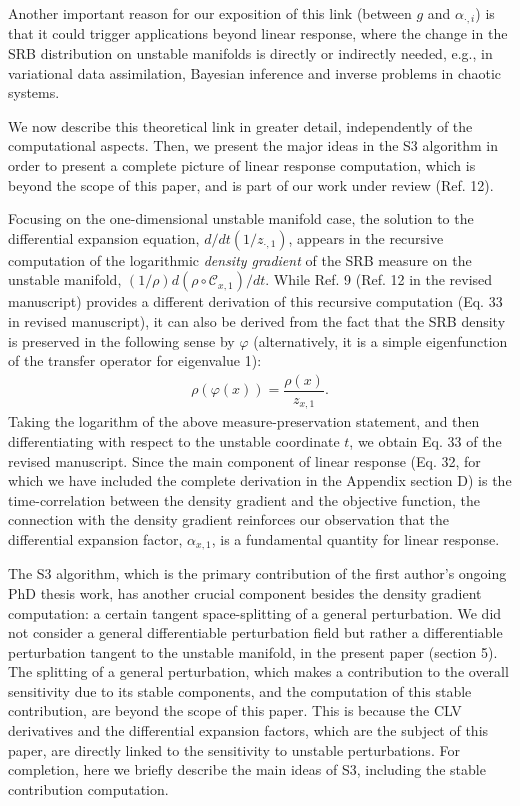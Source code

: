 \documentclass[11pt]{article}
\begin{document}
Another important reason for our exposition of this link (between $g$ and $\alpha_{\cdot,i}$) is that it could trigger applications beyond linear response, where the change in the SRB distribution on unstable manifolds is directly or indirectly needed, e.g., in variational data assimilation, Bayesian inference and inverse problems in chaotic systems. 

We now describe this theoretical link in greater detail, independently of the computational aspects. Then, we present the major ideas in the S3 algorithm in order to present a complete picture of linear response computation, which is beyond the scope of this paper, and is part of our work under review (Ref. 12).

Focusing on the one-dimensional unstable manifold case, the solution to the differential expansion equation, $d/dt(1/z_{\cdot, 1})$, appears in the recursive computation of the logarithmic {\em density gradient} of the SRB measure on the unstable manifold, $(1/\rho) d(\rho\circ\mathcal{C}_{x,1})/dt.$ While Ref. 9 (Ref. 12 in the revised manuscript) provides a different derivation of this recursive computation (Eq. 33 in revised manuscript), it can also be derived from the fact that the SRB density is preserved in the following sense by $\varphi$ (alternatively, it is a simple eigenfunction of the transfer operator for eigenvalue 1):
\begin{align*}
		\rho(\varphi(x)) = \dfrac{\rho(x)}{z_{x,1}}. 
\end{align*}
Taking the logarithm of the above measure-preservation statement, and then differentiating with respect to the unstable coordinate $t$, we obtain Eq. 33 of the revised manuscript. 
Since the main component of linear response (Eq. 32, for which we have included the complete derivation in the Appendix section D) is the time-correlation between the density gradient and the objective function, the connection with the density gradient reinforces our observation that the differential expansion factor, $\alpha_{x,1}$, is a fundamental quantity for linear response. 

The S3 algorithm, which is the primary contribution of the first author's ongoing PhD thesis work, has another crucial component besides the density gradient computation: a certain tangent space-splitting of a general perturbation. We did not consider a general differentiable perturbation field but rather a differentiable perturbation tangent to the unstable manifold, in the present paper (section 5). The splitting of a general perturbation, which makes a contribution to the overall sensitivity due to its stable components, and the computation of this stable contribution, are beyond the scope of this paper. This is because the CLV derivatives and the differential expansion factors, which are the subject of this paper, are directly linked to the sensitivity to unstable perturbations. For completion, here we briefly describe the main ideas of S3, including the stable contribution computation.
\end{document}
